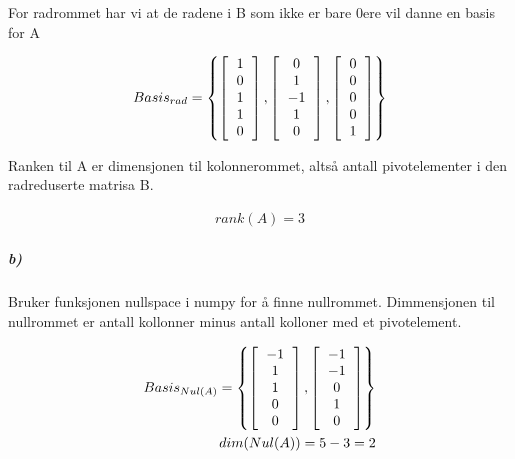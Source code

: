 \documentclass[11pt, A4paper,norsk]{article}
\begin{document}
				\begin{flushleft}
For radrommet har vi at de radene i B som ikke er bare $0$ere vil danne en basis for A 
				\end{flushleft}
				\begin{align}
Basis_{rad} = 
\left \{
\left[
\begin{tabular} { c }
$1$ \\
$0$ \\
$1$ \\
$1$ \\
$0$
\end{tabular}
\right]
,
\left[
\begin{tabular} { c }
$0$ \\
$1$ \\
$-1$ \\
$1$ \\
$0$
\end{tabular}
\right]
,
\left[
\begin{tabular} { c }
$0$ \\
$0$ \\
$0$ \\
$0$ \\
$1$
\end{tabular}
\right]
\right\}
				\end{align}
				\begin{flushleft}
Ranken til A er dimensjonen til kolonnerommet, altså antall pivotelementer i den radreduserte matrisa B.
				\end{flushleft}
				\begin{align}
rank(A) = 3
				\end{align}








			\subparagraph{b)}
				\begin{flushleft}
Bruker funksjonen nullspace i numpy for å finne nullrommet. Dimmensjonen til nullrommet er antall kollonner minus antall kolloner med et pivotelement.
				\end{flushleft}

				\begin{align}
Basis_{Nul(A)} = 
\left \{
\left[
\begin{tabular} { c }
$-1$ \\
$1$ \\
$1$ \\
$0$ \\
$0$
\end{tabular}
\right]
,
\left[
\begin{tabular} { c }
$-1$ \\
$-1$ \\
$0$ \\
$1$ \\
$0$
\end{tabular}
\right]
\right\} \\
dim(Nul(A)) = 5 - 3 = 2
				\end{align}
\end{document}
